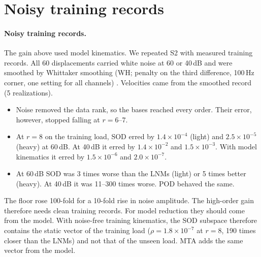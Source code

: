 \documentclass[11pt]{article}
\begin{document}
\section{Noisy training records}\label{sec:s-noise}
\paragraph{Noisy training records.} The gain above used model kinematics. We repeated S2 with measured training records. All 60 displacements carried white noise at 60 or 40\,dB and were smoothed by Whittaker smoothing (WH; penalty on the third difference, 100\,Hz corner, one setting for all channels) \citep{Eilers2003}. Velocities came from the smoothed record (5 realizations).
\begin{itemize}
\item Noise removed the data rank, so the bases reached every order. Their error, however, stopped falling at $r=6$--7.
\item At $r=8$ on the training load, SOD erred by $1.4\times10^{-4}$ (light) and $2.5\times10^{-5}$ (heavy) at 60\,dB. At 40\,dB it erred by $1.4\times10^{-2}$ and $1.5\times10^{-3}$. With model kinematics it erred by $1.5\times10^{-6}$ and $2.0\times10^{-7}$.
\item At 60\,dB SOD was 3 times worse than the LNMs (light) or 5 times better (heavy). At 40\,dB it was 11--300 times worse. POD behaved the same.
\end{itemize}
The floor rose 100-fold for a 10-fold rise in noise amplitude. The high-order gain therefore needs clean training records. For model reduction they should come from the model.
With noise-free training kinematics, the SOD subspace therefore contains the static vector of the training load ($\rho=1.8\times10^{-7}$ at $r=8$, 190 times closer than the LNMs) and not that of the unseen load. MTA adds the same vector from the model.



\end{document}
